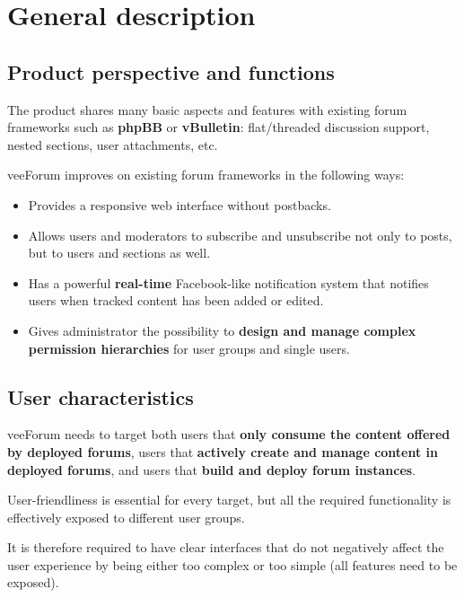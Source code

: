 \documentclass[12pt]{report}
\renewcommand\emph{\textbf}
\begin{document}
            \section{General description}
                \subsection{Product perspective and functions}
                    The product shares many basic aspects and features with existing forum frameworks such as \emph{phpBB} or \emph{vBulletin}: flat/threaded discussion support, nested sections, user attachments, etc.

                    veeForum improves on existing forum frameworks in the following ways:

                    \begin{itemize}
                        \item Provides a responsive web interface without postbacks.
                        \item Allows users and moderators to subscribe and unsubscribe not only to posts, but to users and sections as well.
                        \item Has a powerful \emph{real-time} Facebook-like notification system that notifies users when tracked content has been added or edited.
                        \item Gives administrator the possibility to \emph{design and manage complex permission hierarchies} for user groups and single users.
                    \end{itemize}

                \subsection{User characteristics}
                    veeForum needs to target both users that \emph{only consume the content offered by deployed forums}, users that \emph{actively create and manage content in deployed forums}, and users that \emph{build and deploy forum instances}.

                    User-friendliness is essential for every target, but all the required functionality is effectively exposed to different user groups.

                    It is therefore required to have clear interfaces that do not negatively affect the user experience by being either too complex or too simple (all features need to be exposed).
\end{document}
